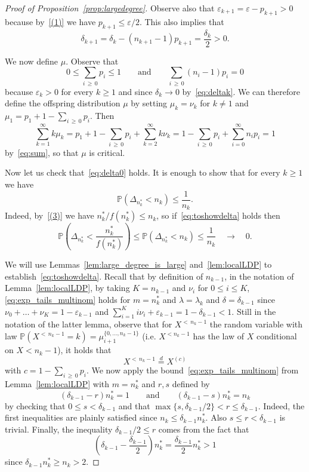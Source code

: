 \documentclass[10pt]{amsart}
\theoremstyle{definition}\newtheorem{defi}[theo]{Definition}\newtheorem{rema}[theo]{Remark}\newtheorem{exam}[theo]{Example}\newtheorem{exem}[theo]{Example}\newtheorem{nota}[theo]{Notation}
\renewcommand{\P}{\mathbb{P}}
\begin{document}
\begin{proof}[Proof of Proposition~\ref{prop:largedegree}]
Observe also that $\varepsilon_{k+1}=\varepsilon-p_{k+1}>0$ because by~\eqref{(1)} we have $ p_{k+1}\leq \varepsilon/2$. This also implies that
\begin{equation}\label{eq:deltak}
\delta_{k+1}=\delta_{k}- (n_{k+1}-1) p_{k+1}=\frac{\delta_{k}}{2}>0.
\end{equation}

We now define $\mu$. Observe that
\begin{equation}\label{eq:sum}
0 \leq \sum_{i\,\geq\,0} p_i\le 1 \qquad \text{and} \qquad \sum_{i\,\geq\,0}(n_i-1) p_i =0
\end{equation}
because $\varepsilon_{k}>0$ for every $k \geq 1$ and since $\delta_{k} \rightarrow 0$ by~\eqref{eq:deltak}. We can therefore define the offspring distribution $\mu$ by setting $\mu_{k}=\nu_{k}$ for $k \neq 1$ and $\mu_1=p_1+1-\sum_{i\,\geq\,0}p_i$. Then
\[
\sum_{k=1}^{\infty} k \mu_{k}=p_1+1-\sum_{i\,\geq\,0}p_i+\sum_{k=2}^{\infty} k \nu_{k}=1-\sum_{i\,\geq\,0}p_i+\sum_{i=0}^{\infty} n_{i} {p_{i}}=1
\]
by~\eqref{eq:sum}, so that $\mu$ is critical.

Now let us check that~\eqref{eq:delta0} holds. It is enough to show that for every $k \geq 1$ we have
\begin{equation}\label{eq:toshowdelta}
\P\left(\Delta_{n_{k}^*}< n_{k}\right) \leq \frac{1}{n_{k}}.
\end{equation}
Indeed, by~\eqref{(3)} we have $n_{k}^*/f(n_{k}^*) \leq n_{k}$, so if~\eqref{eq:toshowdelta} holds then
\[
\P\left(\Delta_{n_{k}^*}< \frac{n_{k}^*}{f(n_{k}^*)} \right)\leq \P\left(\Delta_{n_{k}^*}< n_{k}\right) \leq \frac{1}{n_{k}} \quad \longrightarrow \quad 0.
\]

We will use Lemmas~\ref{lem:large_degree_is_large} and~\ref{lem:localLDP} to establish~\eqref{eq:toshowdelta}. Recall that by definition of $n_{k-1}$, in the notation of Lemma~\ref{lem:localLDP}, by taking $K=n_{k-1}$ and $\nu_i$ for $0 \leq i\leq K$, \eqref{eq:exp_tails_multinom} holds for $m=n_{k}^{*}$ and $\lambda=\lambda_{k}$ and $\delta=\delta_{k-1}$ since $\nu_0+\dots+\nu_K=1-\varepsilon_{k-1}$ and $\sum_{i=1}^K i\nu_i+\varepsilon_{k-1}=1-\delta_{k-1}<1$. Still in the notation of the latter lemma, observe that for $X^{<\,n_k-1}$ the random variable with law $\P(X^{<\,n_k-1}=k)=\mu^{\{0,\dots, n_k-1\}}_{i+1}$ (i.e. $X^{<n_k-1}$ has the law of $X$ conditional on $X<n_k-1$), it holds that
\[
X^{<\,n_{k}-1}\overset{d}{=}X^{(c)}
\]
with $c=1-\sum_{i\,\geq\,0} p_i$. We now apply the bound~\eqref{eq:exp_tails_multinom} from Lemma~\ref{lem:localLDP} with $m=n_{k}^*$ and $r,s$ defined by
\[
(\delta_{k-1}-r)n_{k}^*=1 \qquad \text{and} \qquad (\delta_{k-1}-s)n_{k}^*=n_{k}
\]
by checking that $0\leq s <\delta_{k-1}$ and that $\max\{s,\delta_{k-1}/2\}< r\le \delta_{k-1} $. Indeed, the first inequalities are plainly satisfied since $n_k\leq \delta_{k-1} n^*_k$. Also $s \leq r<\delta_{k-1}$ is trivial. Finally, the inequality $\delta_{k-1}/2 \leq r$ comes from the fact that
\[
\left(\delta_{k-1}- \frac{\delta_{k-1}}{2} \right)n_{k}^*= \frac{\delta_{k-1}}{2} n_{k}^*>1
\]
since $\delta_{k-1} n^*_k\ge n_k>2$.


\end{proof}
\end{document}
